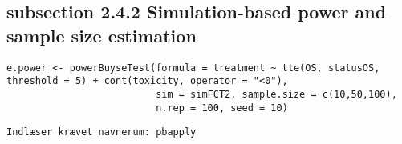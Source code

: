 \documentclass[12pt]{article}
\begin{document}
\subsection{subsection 2.4.2 Simulation-based power and sample size estimation}
\label{sec:org01f8a67}

\lstset{language=r,label= ,caption= ,captionpos=b,numbers=none}
\begin{lstlisting}
e.power <- powerBuyseTest(formula = treatment ~ tte(OS, statusOS, threshold = 5) + cont(toxicity, operator = "<0"),
                          sim = simFCT2, sample.size = c(10,50,100),
                          n.rep = 100, seed = 10)
\end{lstlisting}

\begin{verbatim}
Indlæser krævet navnerum: pbapply


\end{verbatim}
\end{document}
